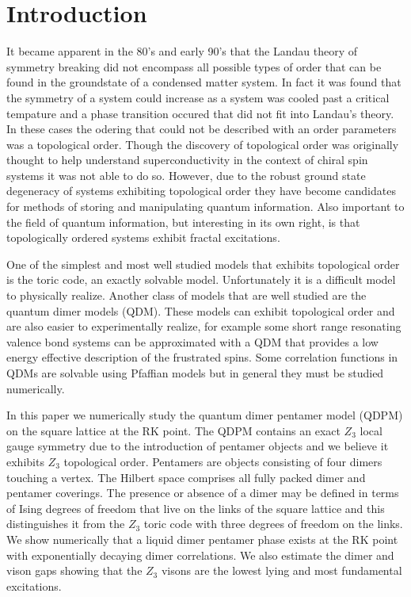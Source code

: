 \documentclass[aps,floatfix,11pt,twocolumn]{revtex4-1}
\begin{document}
\section{Introduction}

    It became apparent in the 80's and early 90's that the Landau theory of symmetry breaking did not
    encompass all possible types of order that can be found in the groundstate of a condensed matter system. 
    In fact it was found that the symmetry of a system
    could increase as a system was cooled past a critical tempature and a phase transition occured
    that did not fit into Landau's theory. In these cases the odering 
    that could not be described with an order
    parameters \cite{wen_1990} was a topological order. Though the discovery of topological order was originally thought
    to help understand superconductivity in the context of chiral spin systems \cite{HERE} it was
    not able to do so. However, due to the robust ground state degeneracy of systems exhibiting
    topological order they have become candidates for methods of storing and manipulating
    quantum information.  Also important to the field of quantum information, but interesting in
    its own right, is that topologically ordered systems exhibit fractal excitations. 

    One of the simplest and most well studied models that exhibits topological order is the
    toric code, an exactly solvable model. Unfortunately it is
    a difficult model to physically realize. Another class of models that are well studied are
    the quantum dimer models (QDM).  These models can exhibit topological order and are also
    easier to experimentally realize, for example some short range resonating valence bond
    systems can be approximated with a QDM that provides a low energy effective description of
    the frustrated spins. Some correlation functions in QDMs are solvable using Pfaffian models
    but in general they must be studied numerically. 

    In this paper we numerically study the quantum dimer pentamer model (QDPM) on the square
    lattice at the RK point.  The QDPM contains an exact $Z_3$ local gauge symmetry due to the
    introduction of pentamer objects and we believe it exhibits $Z_3$ topological order.
    Pentamers are objects consisting of four dimers touching a vertex.  The Hilbert space
    comprises all fully packed dimer and pentamer coverings. The presence or absence of a dimer
    may be defined in terms of Ising degrees of freedom that live on the links of the square
    lattice and this distinguishes it from the $Z_3$ toric code with three degrees of freedom on
    the links. We show numerically that a liquid dimer pentamer phase exists at the RK point
    with exponentially decaying dimer correlations. We also estimate the dimer and vison gaps
    showing that the $Z_3$ visons are the lowest lying and most fundamental excitations.
\end{document}
